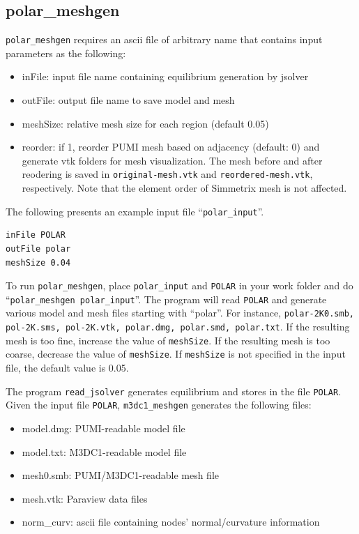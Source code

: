 \subsection{polar\_meshgen}
\label{ch:polar-gen}
\texttt{polar\_meshgen} requires an ascii file of arbitrary name that contains input parameters as the following:
\begin{itemize}
\item inFile: input file name containing equilibrium generation by jsolver
\item outFile: output file name to save model and mesh
\item meshSize: relative mesh size for each region (default 0.05)
\item reorder: if 1, reorder PUMI mesh based on adjacency (default: 0) and generate vtk folders for mesh visualization. The mesh before and after reodering is saved in \texttt{original-mesh.vtk} and \texttt{reordered-mesh.vtk}, respectively. Note that the element order of Simmetrix mesh is not affected.
\end{itemize}

The following presents an example input file ``\texttt{polar\_input}''.
\begin{verbatim}
inFile POLAR
outFile polar
meshSize 0.04
\end{verbatim}

To run \texttt{polar\_meshgen}, place \texttt{polar\_input} and \texttt{POLAR} in your work folder and do ``\texttt{polar\_meshgen polar\_input}''. The program will read \texttt{POLAR} and generate various model and mesh files starting with ``polar''. For instance, \texttt{polar-2K0.smb, pol-2K.sms, pol-2K.vtk, polar.dmg, polar.smd, polar.txt}. If the resulting mesh is too fine, increase the value of \texttt{meshSize}. If the resulting mesh is too coarse, decrease the value of \texttt{meshSize}. If \texttt{meshSize} is not specified in the input file, the default value is 0.05.   

The program \texttt{read\_jsolver} generates equilibrium and stores in the file \texttt{POLAR}. Given the input file \texttt{POLAR}, \texttt{m3dc1\_meshgen} generates the following files:
\begin{itemize}
\item	model.dmg: PUMI-readable model file
\item	model.txt: M3DC1-readable model file
\item	mesh0.smb: PUMI/M3DC1-readable mesh file
\item	mesh.vtk: Paraview data files
\item	norm\_curv: ascii file containing nodes' normal/curvature information
\end{itemize} 


